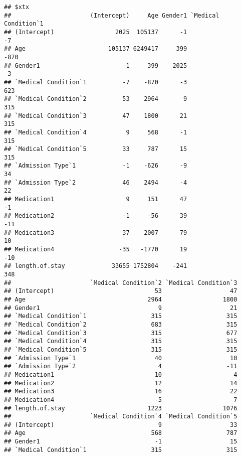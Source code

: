 \documentclass[
]{article}
\begin{document}
\begin{verbatim}
## $xtx
##                      (Intercept)     Age Gender1 `Medical Condition`1
## (Intercept)                 2025  105137      -1                   -7
## Age                       105137 6249417     399                 -870
## Gender1                       -1     399    2025                   -3
## `Medical Condition`1          -7    -870      -3                  623
## `Medical Condition`2          53    2964       9                  315
## `Medical Condition`3          47    1800      21                  315
## `Medical Condition`4           9     568      -1                  315
## `Medical Condition`5          33     787      15                  315
## `Admission Type`1             -1    -626      -9                   34
## `Admission Type`2             46    2494      -4                   22
## Medication1                    9     151      47                   -1
## Medication2                   -1     -56      39                  -11
## Medication3                   37    2007      79                   10
## Medication4                  -35   -1770      19                  -10
## length.of.stay             33655 1752804    -241                  348
##                      `Medical Condition`2 `Medical Condition`3
## (Intercept)                            53                   47
## Age                                  2964                 1800
## Gender1                                 9                   21
## `Medical Condition`1                  315                  315
## `Medical Condition`2                  683                  315
## `Medical Condition`3                  315                  677
## `Medical Condition`4                  315                  315
## `Medical Condition`5                  315                  315
## `Admission Type`1                      40                   10
## `Admission Type`2                       4                  -11
## Medication1                            10                    4
## Medication2                            12                   14
## Medication3                            16                   22
## Medication4                            -5                    7
## length.of.stay                       1223                 1076
##                      `Medical Condition`4 `Medical Condition`5
## (Intercept)                             9                   33
## Age                                   568                  787
## Gender1                                -1                   15
## `Medical Condition`1                  315                  315

\end{verbatim}
\end{document}
